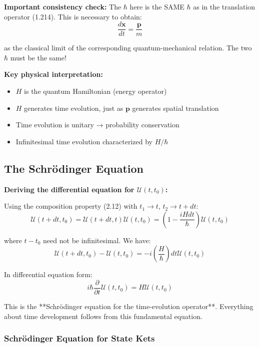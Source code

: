\documentclass[11pt,a4paper]{article}
\begin{document}
\textbf{Important consistency check:} The $\hbar$ here is the SAME $\hbar$ as in the translation operator (1.214). This is necessary to obtain:
\begin{equation}
\frac{d\mathbf{x}}{dt} = \frac{\mathbf{p}}{m}
\tag{2.22}
\end{equation}

as the classical limit of the corresponding quantum-mechanical relation. The two $\hbar$ must be the same!

\textbf{Key physical interpretation:}
\begin{itemize}
\item $H$ is the quantum Hamiltonian (energy operator)
\item $H$ generates time evolution, just as $\mathbf{p}$ generates spatial translation
\item Time evolution is unitary → probability conservation
\item Infinitesimal time evolution characterized by $H/\hbar$
\end{itemize}
\subsection{The Schrödinger Equation}

\textbf{Deriving the differential equation for $\mathscr{U}(t, t_0)$:}

Using the composition property (2.12) with $t_1 \to t$, $t_2 \to t + dt$:
\begin{equation}
\mathscr{U}(t + dt, t_0) = \mathscr{U}(t + dt, t)\mathscr{U}(t, t_0) = \left(1 - \frac{iHdt}{\hbar}\right)\mathscr{U}(t, t_0)
\tag{2.23}
\end{equation}

where $t - t_0$ need not be infinitesimal. We have:
\begin{equation}
\mathscr{U}(t + dt, t_0) - \mathscr{U}(t, t_0) = -i\left(\frac{H}{\hbar}\right)dt\mathscr{U}(t, t_0)
\tag{2.24}
\end{equation}

In differential equation form:
\begin{equation}
\boxed{i\hbar\frac{\partial}{\partial t}\mathscr{U}(t, t_0) = H\mathscr{U}(t, t_0)}
\tag{2.25}
\end{equation}

This is the **Schrödinger equation for the time-evolution operator**. Everything about time development follows from this fundamental equation.

\subsubsection{Schrödinger Equation for State Kets}
\end{document}
